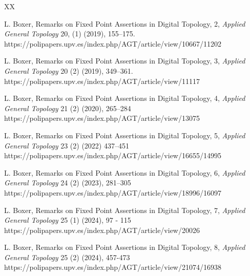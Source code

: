 \documentclass{article}
\numberwithin{thm}{section}
\begin{document}
\begin{thebibliography}{XX}

L. Boxer, 
Remarks on Fixed Point Assertions in Digital Topology, 2, 
{\em Applied General Topology} 20, (1) (2019), 155--175.
\newline
https://polipapers.upv.es/index.php/AGT/article/view/10667/11202

L. Boxer, Remarks on Fixed Point Assertions in Digital Topology, 3,
{\em Applied General Topology} 20 (2) (2019), 349--361. 
\newline
https://polipapers.upv.es/index.php/AGT/article/view/11117


 L. Boxer, Remarks on Fixed Point Assertions in Digital Topology, 4, 
 {\em Applied General Topology} 21 (2) (2020), 265--284
\newline
https://polipapers.upv.es/index.php/AGT/article/view/13075

L. Boxer, Remarks on Fixed Point Assertions in 
Digital Topology, 5, 
{\em Applied General Topology} 
23 (2) (2022) 437--451
\newline
https://polipapers.upv.es/index.php/AGT/article/view/16655/14995

L. Boxer, Remarks on Fixed Point Assertions in Digital Topology, 6,
{\em Applied General Topology}
24 (2) (2023), 
281--305
\newline
https://polipapers.upv.es/index.php/AGT/article/view/18996/16097

L. Boxer,
Remarks on Fixed Point Assertions in Digital Topology, 7,
{\em Applied General Topology} 25 (1) (2024), 97 - 115
\newline
https://polipapers.upv.es/index.php/AGT/article/view/20026

L. Boxer, Remarks on Fixed Point Assertions in Digital Topology, 8, 
{\em Applied General Topology} 25 (2) (2024), 457-473
\newline
https://polipapers.upv.es/index.php/AGT/article/view/21074/16938


\end{thebibliography}
\end{document}
